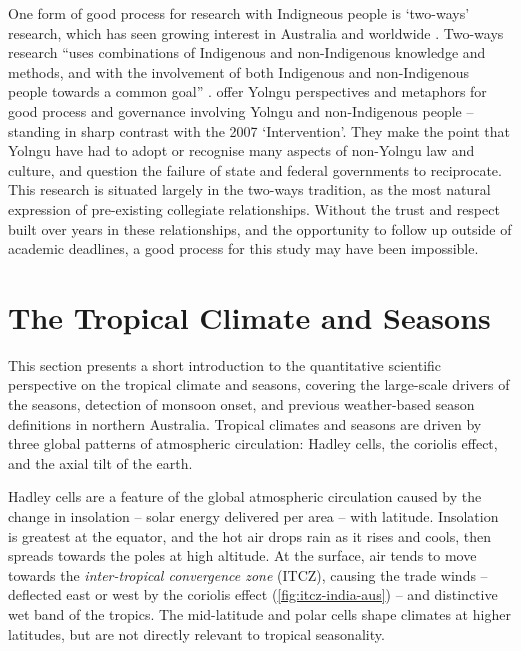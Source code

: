 One form of good process for research with Indigneous people is `two-ways'
research, which has seen growing interest in Australia and worldwide
\citep{turner2009,prober2011}.  Two-ways research ``uses combinations of
Indigenous and non-Indigenous knowledge and methods, and with the involvement
of both Indigenous and non-Indigenous people towards a common goal''
\citep{ens2014}.
%
\citet{marika2009} offer Yolngu perspectives and metaphors for good process
and governance involving Yolngu and non-Indigenous people -- standing in sharp
contrast with the 2007 `Intervention'.  They make the point that Yolngu have
had to adopt or recognise many aspects of non-Yolngu law and culture, and
question the failure of state and federal governments to reciprocate.
%
This research is situated largely in the two-ways tradition, as the most
natural expression of pre-existing collegiate relationships.  Without the
trust and respect built over years in these relationships, and the opportunity
to follow up outside of academic deadlines, a good process for this study
may have been impossible.



\section{The Tropical Climate and Seasons}
\label{sec:lit-tropical-climate}

This section presents a short introduction to the quantitative scientific
perspective on the tropical climate and seasons, covering the large-scale
drivers of the seasons, detection of monsoon onset, and previous
weather-based season definitions in northern Australia.
%
Tropical climates and seasons are driven by three global patterns of
atmospheric circulation:  Hadley cells, the coriolis effect, and the axial
tilt of the earth.

Hadley cells are a feature of the global atmospheric circulation
caused by the change in insolation -- solar energy delivered per area --
with latitude.  Insolation is greatest at the equator, and the hot air drops
rain as it rises and cools, then spreads towards the poles at high altitude.
At the surface, air tends to move towards the \textit{inter-tropical
convergence zone} (ITCZ), causing the trade winds -- deflected east or west
by the coriolis effect (\cref{fig:itcz-india-aus}) -- and distinctive wet band
of the tropics.  The mid-latitude and polar cells shape climates at higher
latitudes, but are not directly relevant to tropical seasonality.

